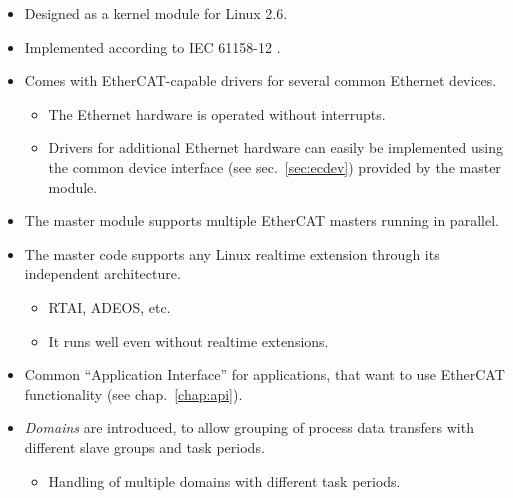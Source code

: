 \documentclass[a4paper,12pt,BCOR6mm,bibtotoc,idxtotoc]{scrbook}
\begin{document}
\begin{itemize}

\item Designed as a kernel module for Linux 2.6.

\item Implemented according to IEC 61158-12 \cite{dlspec} \cite{alspec}.

\item Comes with EtherCAT-capable drivers for several common Ethernet devices.

  \begin{itemize}

  \item The Ethernet hardware is operated without interrupts.

  \item Drivers for additional Ethernet hardware can easily be implemented
  using the common device interface (see sec.~\ref{sec:ecdev}) provided by the
  master module.

  \end{itemize}

\item The master module supports multiple EtherCAT masters running in
parallel.

\item The master code supports any Linux realtime extension through its
independent architecture.

  \begin{itemize}

  \item RTAI,
  ADEOS, etc.

  \item It runs well even without realtime extensions.

  \end{itemize}

\item Common ``Application Interface'' for applications, that want to use
EtherCAT functionality (see chap.~\ref{chap:api}).

\item \textit{Domains} are introduced, to allow grouping of process
  data transfers with different slave groups and task periods.

  \begin{itemize}

  \item Handling of multiple domains with different task periods.


\end{itemize}
\end{itemize}
\end{document}
